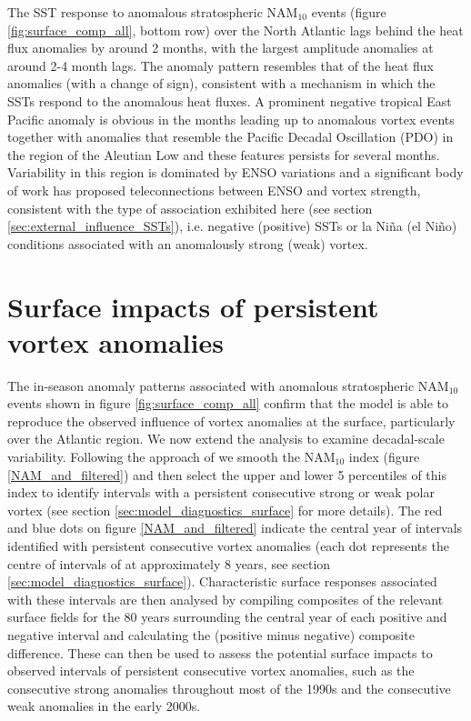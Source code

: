 The SST response to anomalous stratospheric NAM$_{10}$ events (figure \ref{fig:surface_comp_all}, bottom row) over the North Atlantic lags behind the heat flux anomalies by around 2 months, with the largest amplitude anomalies at around 2-4 month lags.  The anomaly pattern resembles that of the heat flux anomalies (with a change of sign), consistent with a mechanism in which the SSTs respond to the anomalous heat fluxes. A prominent negative tropical East Pacific anomaly is obvious in the months leading up to anomalous vortex events together with  anomalies that resemble the Pacific Decadal Oscillation (PDO) in the region of the Aleutian Low \cite{mantuaPacific1997} and these features persists for several months. Variability in this region is dominated by ENSO variations and a significant body of work has proposed teleconnections between ENSO and vortex strength, consistent with the type of association exhibited here (see section \ref{sec:external_influence_SSTs}), i.e. negative (positive) SSTs or la Ni\~{n}a (el Ni\~{n}o) conditions associated with an anomalously strong (weak) vortex. 

\section{Surface impacts of persistent vortex anomalies}
\label{persistent}
The in-season anomaly patterns associated with anomalous stratospheric NAM$_{10}$ events shown in figure \ref{fig:surface_comp_all} confirm that the model is able to reproduce the observed influence of vortex anomalies at the surface, particularly over the Atlantic region. We now extend the analysis to examine decadal-scale variability. Following the approach of \cite{reichlerStratospheric2012} we smooth the NAM$_{10}$ index  (figure \ref{NAM_and_filtered}) and then select the upper and lower 5 percentiles of this index to identify intervals with a persistent consecutive strong or weak polar vortex (see section \ref{sec:model_diagnostics_surface} for more details). The red and blue dots on figure \ref{NAM_and_filtered} indicate the central year of intervals identified with persistent consecutive vortex anomalies (each dot represents the centre of intervals of at approximately 8 years, see section \ref{sec:model_diagnostics_surface}). Characteristic surface responses associated with these intervals are then analysed by compiling composites of the relevant surface fields for the 80 years surrounding the central year of each positive and negative interval and calculating the (positive minus negative) composite difference. These can then be used to assess the potential surface impacts to observed intervals of persistent consecutive vortex anomalies, such as the consecutive strong anomalies throughout most of the 1990s and the consecutive weak anomalies in the early 2000s. 

